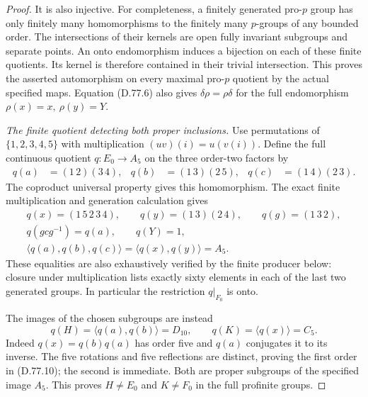 \begin{proof}
It is also injective. For completeness, a finitely
generated pro-$p$ group has only finitely many
homomorphisms to the finitely many $p$-groups of any
bounded order. The intersections of their kernels
are open fully invariant subgroups and separate points.
An onto endomorphism induces a bijection on each
of these finite quotients. Its kernel is therefore
contained in their trivial intersection.
This proves the asserted automorphism on every
maximal pro-$p$ quotient by the actual specified maps.
Equation (D.77.6) also gives
$\delta\rho=\rho\delta$ for the full endomorphism
$\rho(x)=x,\ \rho(y)=Y$.

\emph{The finite quotient detecting both proper inclusions.}
Use permutations of $\{1,2,3,4,5\}$ with multiplication
$(uv)(i)=u(v(i))$. Define the full continuous quotient
$q:E_0\to A_5$ on the three order-two factors by
\[
 \begin{aligned}
 q(a)&=(1\,2)(3\,4),&
 q(b)&=(1\,3)(2\,5),&
 q(c)&=(1\,4)(2\,3).
 \end{aligned}                                                \tag{D.77.8}
\]
The coproduct universal property gives this homomorphism.
The exact finite multiplication and generation
calculation gives
\[
 \begin{gathered}
 q(x)=(1\,5\,2\,3\,4),\qquad
 q(y)=(1\,3)(2\,4),\qquad q(g)=(1\,3\,2),\\
 q(gcg^{-1})=q(a),\qquad q(Y)=1,\\
 \langle q(a),q(b),q(c)\rangle
       =\langle q(x),q(y)\rangle=A_5 .
 \end{gathered}                                                \tag{D.77.9}
\]
These equalities are also exhaustively verified by
the finite producer below: closure under multiplication
lists exactly sixty elements in each of the last two
generated groups.
In particular the restriction $q|_{F_0}$ is onto.

The images of the chosen subgroups are instead
\[
 q(H)=\langle q(a),q(b)\rangle=D_{10},\qquad
 q(K)=\langle q(x)\rangle=C_5 .
                                                               \tag{D.77.10}
\]
Indeed $q(x)=q(b)q(a)$ has order five and
$q(a)$ conjugates it to its inverse. The five rotations
and five reflections are distinct, proving the first
order in (D.77.10); the second is immediate.
Both are proper subgroups of the specified image $A_5$.
This proves $H\ne E_0$ and $K\ne F_0$ in the full
profinite groups.


\end{proof}
